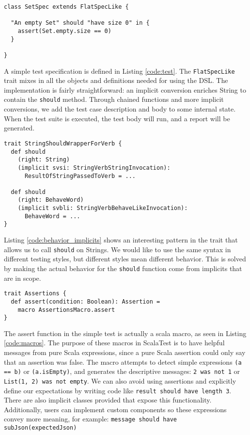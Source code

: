\begin{lstlisting}[caption=Simple test, label=code:test, float, floatplacement=H]
class SetSpec extends FlatSpecLike {

  "An empty Set" should "have size 0" in {
    assert(Set.empty.size == 0)
  }
	
}
\end{lstlisting}

A simple test specification is defined in Listing \ref{code:test}.
The \texttt{FlatSpecLike} trait mixes in all the objects and definitions needed for using the DSL.
The implementation is fairly straightforward: an implicit conversion enriches String to contain the \texttt{should} method.
Through chained functions and more implicit conversions, we add the test case description and body to some internal state.
When the test suite is executed, the test body will run, and a report will be generated.

\begin{lstlisting}[caption=Behavior from implicits, label=code:behavior_implicits, float, floatplacement=H]
trait StringShouldWrapperForVerb {
  def should
    (right: String)
    (implicit svsi: StringVerbStringInvocation):
      ResultOfStringPassedToVerb = ...
      
  def should
    (right: BehaveWord)
    (implicit svbli: StringVerbBehaveLikeInvocation):
      BehaveWord = ...
}
\end{lstlisting}

Listing \ref{code:behavior_implicits} shows an interesting pattern in the trait that allows us to call \texttt{should} on Strings.
We would like to use the same syntax in different testing styles, but different styles mean different behavior.
This is solved by making the actual behavior for the \texttt{should} function come from implicits that are in scope.

\begin{lstlisting}[caption=Macros, label=code:macros, float, floatplacement=H]
trait Assertions {
  def assert(condition: Boolean): Assertion =
    macro AssertionsMacro.assert
}
\end{lstlisting}

The assert function in the simple test is actually a scala macro, as seen in Listing \ref{code:macros}.
The purpose of these macros in ScalaTest is to have helpful messages from pure Scala expressions, since a pure Scala assertion could only say that an assertion was false.
The macro attempts to detect simple expressions \texttt{(a == b)} or \texttt{(a.isEmpty)}, and generates the descriptive messages: \texttt{2 was not 1} or \texttt{List(1, 2) was not empty}.
We can also avoid using assertions and explicitly define our expectations by writing code like \texttt{result should have length 3}.
There are also implicit classes provided that expose this functionality.
Additionally, users can implement custom components so these expressions convey more meaning, for example: \texttt{message should have subJson(expectedJson)}
